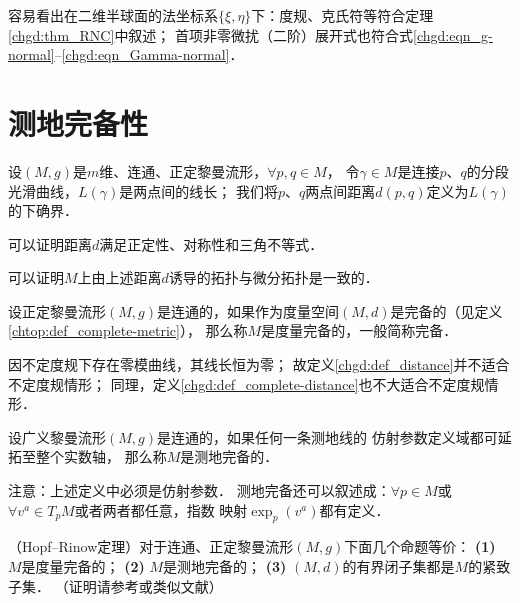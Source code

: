 容易看出在二维半球面的法坐标系$\{\xi,\eta\}$下：度规、克氏符等符合定理\ref{chgd:thm_RNC}中叙述；
首项非零微扰（二阶）展开式也符合式\eqref{chgd:eqn_g-normal}--\eqref{chgd:eqn_Gamma-normal}．





\section{测地完备性}\label{chgd:sec_compelete}
 


\begin{definition}\label{chgd:def_distance}
    设$(M,g)$是$m$维、连通、正定黎曼流形，$\forall p,q \in M$，
    令$\gamma\in M$是连接$p$、$q$的分段光滑曲线，$L(\gamma)$是两点间的线长；
    我们将$p$、$q$两点间{\heiti 距离$d(p,q)$}定义为$L(\gamma)$的下确界．
\end{definition}

可以证明\cite[\S 3.6]{chen-li-2023-2ed-v1}距离$d$满足正定性、对称性和三角不等式．

可以证明\cite[\S 3.6]{chen-li-2023-2ed-v1}$M$上由上述距离$d$诱导的拓扑与微分拓扑是一致的．

\begin{definition}\label{chgd:def_complete-distance}
    设正定黎曼流形$(M,g)$是连通的，如果作为度量空间$(M,d)$是完备的（见定义\ref{chtop:def_complete-metric}），
    那么称$M$是{\heiti 度量完备}的，一般简称{\heiti 完备}．
\end{definition}

因不定度规下存在零模曲线，其线长恒为零；
故定义\ref{chgd:def_distance}并不适合不定度规情形；
同理，定义\ref{chgd:def_complete-distance}也不大适合不定度规情形．

\begin{definition}\label{chgd:def_complete-geodesic}
    设广义黎曼流形$(M,g)$是连通的，如果任何一条测地线的
    {\kaishu 仿射参数}定义域都可延拓至整个实数轴，
    那么称$M$是{\heiti 测地完备}的．
\end{definition}
注意：上述定义中必须是{\kaishu 仿射参数}．
测地完备还可以叙述成：$\forall p\in M$或$\forall v^a\in T_p M$或者两者都任意，指数
映射$\exp_{p}(v^a)$都有定义．


\begin{theorem}\label{chgd:thm_Hopf-Rinow}
    （Hopf--Rinow定理）对于连通、正定黎曼流形$(M,g)$下面几个命题等价：
    {\bfseries (1)} $M$是度量完备的；
    {\bfseries (2)} $M$是测地完备的；
    {\bfseries (3)} $(M,d)$的有界闭子集都是$M$的紧致子集．
    （证明请参考\parencite[\S 3.6]{chen-li-2023-2ed-v1}或类似文献）
\end{theorem}


